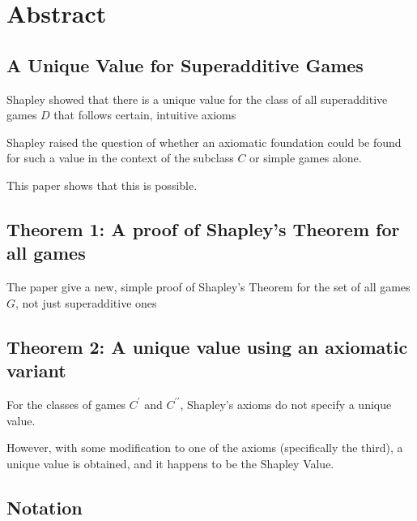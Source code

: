 \documentclass[
paper=128mm:96mm, %
fontsize=11pt, %
pagesize, %
parskip=half-, %
]{scrartcl} %
\theoremstyle{mythmstyle} %
\begin{document}
\section{Abstract}
\clearpage

\subsection*{A Unique Value for Superadditive Games}

Shapley showed that there is a unique value for the class of all superadditive games $D$ that follows certain, intuitive axioms

Shapley raised the question of whether an axiomatic foundation could be found for such a value in the context of the subclass $C$ or simple games alone.

This paper shows that this is possible.

\clearpage

\subsection*{Theorem 1: A proof of Shapley's Theorem for all games}

The paper give a new, simple proof of Shapley's Theorem for the set of all games $G$, not just superadditive ones

\clearpage

\subsection*{Theorem 2: A unique value using an axiomatic variant}

For the classes of games $C^{\prime}$ and $C^{\prime\prime}$, Shapley's axioms do not specify a unique value.

However, with some modification to one of the axioms (specifically the third), a unique value is obtained, and it happens to be the Shapley Value.

\clearpage

\subsection*{Notation}
\end{document}

